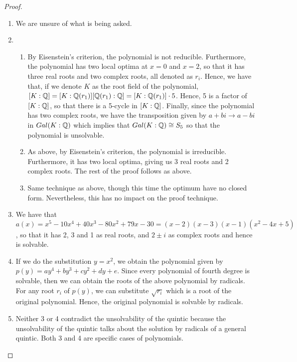\begin{proof}
 \begin{enumerate}
     \item We are unsure of what is being asked.
     \item
     \begin{enumerate}
         \item By Eisenstein's criterion, the polynomial is not reducible. Furthermore, the polynomial has two local optima at $x=0$ and $x=2$, so that it has three real roots and two complex roots, all denoted as $r_i$. Hence, we have that, if we denote $K$ as the root field of the polynomial, $[K:\mathbb{Q}]=[K:\mathbb{Q}(r_1)][\mathbb{Q}(r_1):\mathbb{Q}]=[K:\mathbb{Q}(r_1)]\cdot 5$. Hence, 5 is a factor of $[K:\mathbb{Q}]$, so that there is a 5-cycle in $[K:\mathbb{Q}]$. Finally, since the polynomial has two complex roots, we have the transposition given by $a+bi\to a-bi$ in $Gal(K:\mathbb{Q})$ which implies that $Gal(K:\mathbb{Q})\cong S_5$ so that the polynomial is unsolvable.
         \item As above, by Eisenstein's criterion, the polynomial is irreducible. Furthermore, it has two local optima, giving us 3 real roots and 2 complex roots. The rest of the proof follows as above.
         \item Same technique as above, though this time the optimum have no closed form. Nevertheless, this has no impact on the proof technique. 
     \end{enumerate}
     \item We have that $a(x)=x^5-10x^4+40x^3-80x^2+79x-30= (x-2)(x-3)(x-1)(x^2-4x+5)$, so that it has 2, 3 and 1 as real roots, and $2\pm i$ as complex roots and hence is solvable.
     \item If we do the substitution $y=x^2$, we obtain the polynomial given by $p(y)=ay^4+by^3+cy^2+dy+e$. Since every polynomial of fourth degree is solvable, then we can obtain the roots of the above polynomial by radicals. For any root $r_i$ of $p(y)$, we can substitute $\sqrt{r_i}$ which is a root of the original polynomial. Hence, the original polynomial is solvable by radicals.
    \item Neither 3 or 4 contradict the unsolvability of the quintic because the unsolvability of the quintic talks about the solution by radicals of a general quintic. Both 3 and 4 are specific cases of polynomials.
 \end{enumerate}
\end{proof}

